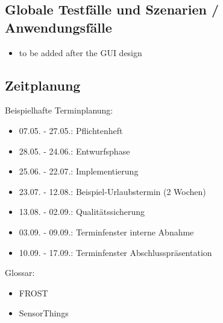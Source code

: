 \documentclass[12 pt]{article}
\begin{document}
\subsection{Globale Testfälle und Szenarien / Anwendungsfälle}
\begin{itemize}
\item to be added after the GUI design
\end{itemize}


\subsection{Zeitplanung}
Beispielhafte Terminplanung: \\
\begin{itemize}
	\item 07.05. - 27.05.: Pflichtenheft
	\item 28.05. - 24.06.: Entwurfsphase
	\item 25.06. - 22.07.: Implementierung
	\item 23.07. - 12.08.: Beispiel-Urlaubstermin (2 Wochen)
	\item 13.08. - 02.09.: Qualitätssicherung
	\item 03.09. - 09.09.: Terminfenster interne Abnahme
	\item 10.09. - 17.09.: Terminfenster Abschlusspräsentation
\end{itemize}


Glossar:
\begin{itemize}
\item FROST
\item SensorThings
\end{itemize}
\end{document}
